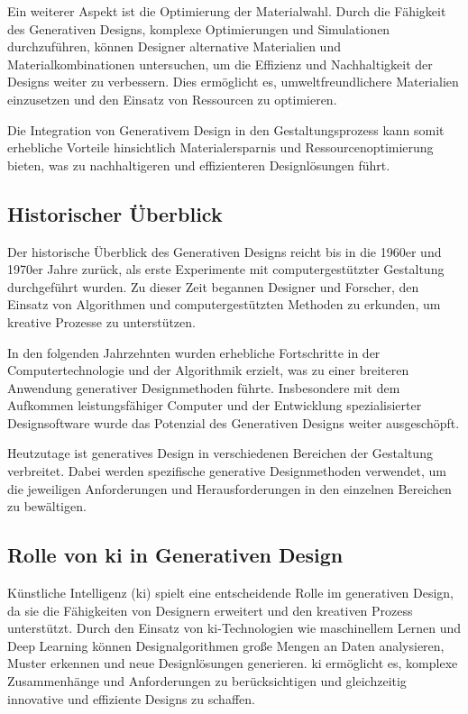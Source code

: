 Ein weiterer Aspekt ist die Optimierung der Materialwahl. Durch die Fähigkeit des Generativen Designs, komplexe Optimierungen und Simulationen durchzuführen, können Designer alternative Materialien und Materialkombinationen untersuchen, um die Effizienz und Nachhaltigkeit der Designs weiter zu verbessern. Dies ermöglicht es, umweltfreundlichere Materialien einzusetzen und den Einsatz von Ressourcen zu optimieren.

Die Integration von Generativem Design in den Gestaltungsprozess kann somit erhebliche Vorteile hinsichtlich Materialersparnis und Ressourcenoptimierung bieten, was zu nachhaltigeren und effizienteren Designlösungen führt. \autocite*{20}

\subsection*{Historischer Überblick}
Der historische Überblick des Generativen Designs reicht bis in die 1960er und 1970er Jahre zurück, als erste Experimente mit computergestützter Gestaltung durchgeführt wurden. Zu dieser Zeit begannen Designer und Forscher, den Einsatz von Algorithmen und computergestützten Methoden zu erkunden, um kreative Prozesse zu unterstützen.

In den folgenden Jahrzehnten wurden erhebliche Fortschritte in der Computertechnologie und der Algorithmik erzielt, was zu einer breiteren Anwendung generativer Designmethoden führte. Insbesondere mit dem Aufkommen leistungsfähiger Computer und der Entwicklung spezialisierter Designsoftware wurde das Potenzial des Generativen Designs weiter ausgeschöpft.

Heutzutage ist generatives Design in verschiedenen Bereichen der Gestaltung verbreitet. Dabei werden spezifische generative Designmethoden verwendet, um die jeweiligen Anforderungen und Herausforderungen in den einzelnen Bereichen zu bewältigen. \autocite*{18}

\subsection*{Rolle von \ac{ki} in Generativen Design}
Künstliche Intelligenz (\ac{ki}) spielt eine entscheidende Rolle im generativen Design, da sie die Fähigkeiten von Designern erweitert und den kreativen Prozess unterstützt. Durch den Einsatz von \ac{ki}-Technologien wie maschinellem Lernen und Deep Learning können Designalgorithmen große Mengen an Daten analysieren, Muster erkennen und neue Designlösungen generieren. \ac{ki} ermöglicht es, komplexe Zusammenhänge und Anforderungen zu berücksichtigen und gleichzeitig innovative und effiziente Designs zu schaffen.

